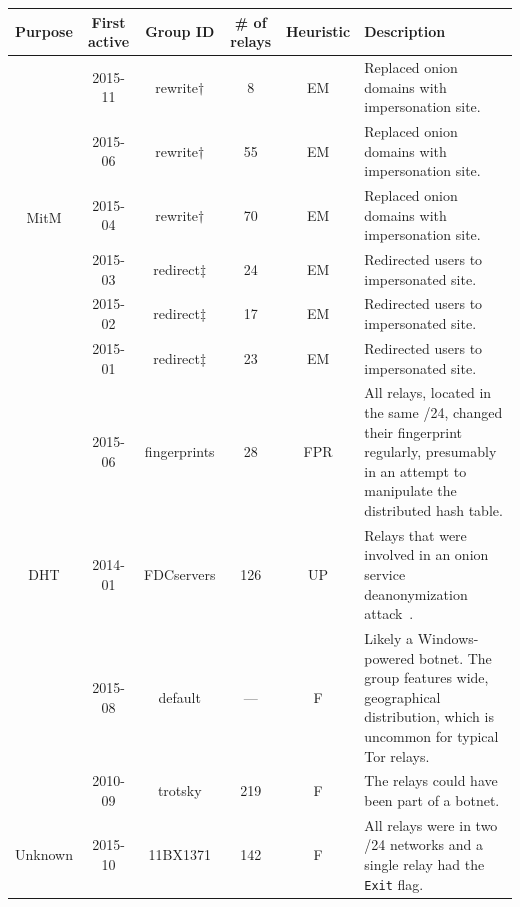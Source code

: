 \begin{table}[t]
\small
\centering
\begin{tabularx}{\textwidth}{c|c c c c X}
\textbf{Purpose} & \textbf{First active} & \textbf{Group ID} & \textbf{\# of
relays} & \textbf{Heuristic} & \textbf{Description} \\
\hline

\multirow{6}{*}{MitM}
& 2015-11 & rewrite$\dagger$ & 8 & EM & Replaced onion domains with impersonation
site. \\

& 2015-06 & rewrite$\dagger$ & 55 & EM & Replaced onion domains with impersonation
site. \\

& 2015-04 & rewrite$\dagger$ & 70 & EM & Replaced onion domains with impersonation
site. \\

& 2015-03 & redirect$\ddagger$ & 24 & EM & Redirected users to impersonated site.
\\

& 2015-02 & redirect$\ddagger$ & 17 & EM & Redirected users to impersonated site.
\\

& 2015-01 & redirect$\ddagger$ & 23 & EM & Redirected users to impersonated site.
\\

\hline

\multirow{3}{*}{DHT}
& 2015-06 & fingerprints & 28 & FPR & All relays, located in the same /24, changed
their fingerprint regularly, presumably in an attempt to manipulate the
distributed hash table. \\

& 2014-01 & FDCservers & 126 & UP & Relays that were involved in an onion service
deanonymization attack~\cite{cmucert}. \\

\hline

\multirow{2}{*}{Botnet}
& 2015-08 & default & --- & F & Likely a Windows-powered botnet.  The group features
wide, geographical distribution, which is uncommon for typical Tor relays. \\

& 2010-09 & trotsky & 219 & F & The relays could have been part of a botnet. \\

\hline

\multirow{5}{*}{Unknown}
& 2015-10 & 11BX1371 & 142 & F & All relays were in two /24 networks and a single
relay had the \texttt{Exit} flag.  \\


\end{tabularx}
\end{table}
